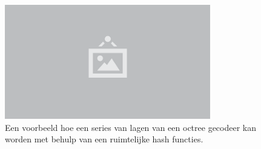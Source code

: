 \begin{figure}
  \centering
  \includegraphics[width=0.8\textwidth]{./img/raw/placeholder.png}
  \caption{Een voorbeeld hoe een series van lagen van een octree gecodeer kan worden met behulp van een ruimtelijke hash functies.}
  \label{fig:hs-linkless-octree-example}
\end{figure}
